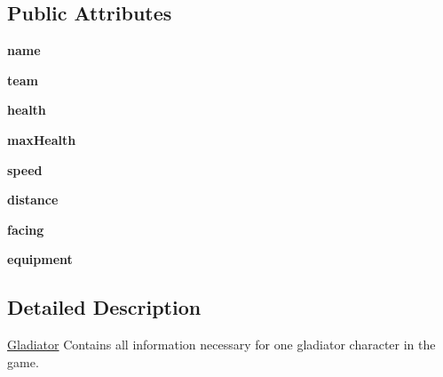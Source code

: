 \subsection*{Public Attributes}
\begin{DoxyCompactItemize}
\item 
\hypertarget{classGladiator_1_1Gladiator_af894668038238b4ba1dbf8985365b475}{}{\bfseries name}\label{classGladiator_1_1Gladiator_af894668038238b4ba1dbf8985365b475}

\item 
\hypertarget{classGladiator_1_1Gladiator_ad0bf3ae31ae0af7539390b845993bdb6}{}{\bfseries team}\label{classGladiator_1_1Gladiator_ad0bf3ae31ae0af7539390b845993bdb6}

\item 
\hypertarget{classGladiator_1_1Gladiator_af4f32c69bf4d0dd4ed9a85587e9a1099}{}{\bfseries health}\label{classGladiator_1_1Gladiator_af4f32c69bf4d0dd4ed9a85587e9a1099}

\item 
\hypertarget{classGladiator_1_1Gladiator_aac365b3532a92f501097dc22dca29c38}{}{\bfseries max\+Health}\label{classGladiator_1_1Gladiator_aac365b3532a92f501097dc22dca29c38}

\item 
\hypertarget{classGladiator_1_1Gladiator_afd2df132e12f6ffbce4a5dba9174c4f5}{}{\bfseries speed}\label{classGladiator_1_1Gladiator_afd2df132e12f6ffbce4a5dba9174c4f5}

\item 
\hypertarget{classGladiator_1_1Gladiator_a5dbd736dbc8f10caf5f6b9529a324be3}{}{\bfseries distance}\label{classGladiator_1_1Gladiator_a5dbd736dbc8f10caf5f6b9529a324be3}

\item 
\hypertarget{classGladiator_1_1Gladiator_ae4c50f25ed8b49c0341b409b3c35e525}{}{\bfseries facing}\label{classGladiator_1_1Gladiator_ae4c50f25ed8b49c0341b409b3c35e525}

\item 
\hypertarget{classGladiator_1_1Gladiator_af8243873f8f3f8a0591d00fce4d5bfea}{}{\bfseries equipment}\label{classGladiator_1_1Gladiator_af8243873f8f3f8a0591d00fce4d5bfea}

\end{DoxyCompactItemize}


\subsection{Detailed Description}
\hyperlink{classGladiator_1_1Gladiator}{Gladiator} Contains all information necessary for one gladiator character in the game. 

